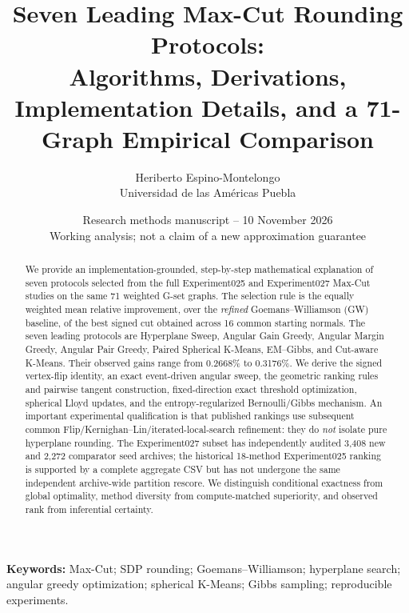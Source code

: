 \documentclass[10pt,letterpaper]{article}
\title{\bfseries Seven Leading Max-Cut Rounding Protocols:\\
Algorithms, Derivations, Implementation Details, and a 71-Graph Empirical Comparison}
\author{Heriberto Espino-Montelongo\\
\small Universidad de las Am\'ericas Puebla}
\date{Research methods manuscript -- 10 November 2026\\
\small Working analysis; not a claim of a new approximation guarantee}
\newcommand{\1}{\mathbf{1}}
\begin{document}
\maketitle
\begin{abstract}
We provide an implementation-grounded, step-by-step mathematical explanation of seven protocols selected from the full Experiment025 and Experiment027 Max-Cut studies on the same 71 weighted G-set graphs. The selection rule is the equally weighted mean relative improvement, over the \emph{refined} Goemans--Williamson (GW) baseline, of the best signed cut obtained across 16 common starting normals. The seven leading protocols are Hyperplane Sweep, Angular Gain Greedy, Angular Margin Greedy, Angular Pair Greedy, Paired Spherical K-Means, EM--Gibbs, and Cut-aware K-Means. Their observed gains range from 0.2668\% to 0.3176\%. We derive the signed vertex-flip identity, an exact event-driven angular sweep, the geometric ranking rules and pairwise tangent construction, fixed-direction exact threshold optimization, spherical Lloyd updates, and the entropy-regularized Bernoulli/Gibbs mechanism. An important experimental qualification is that published rankings use subsequent common Flip/Kernighan--Lin/iterated-local-search refinement: they do \emph{not} isolate pure hyperplane rounding. The Experiment027 subset has independently audited 3,408 new and 2,272 comparator seed archives; the historical 18-method Experiment025 ranking is supported by a complete aggregate CSV but has not undergone the same independent archive-wide partition rescore. We distinguish conditional exactness from global optimality, method diversity from compute-matched superiority, and observed rank from inferential certainty.
\end{abstract}
\noindent\textbf{Keywords:} Max-Cut; SDP rounding; Goemans--Williamson; hyperplane search; angular greedy optimization; spherical K-Means; Gibbs sampling; reproducible experiments.

\tableofcontents
\clearpage












\appendix





\end{document}
